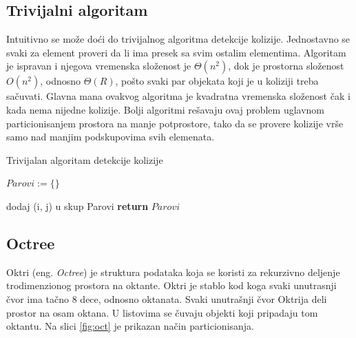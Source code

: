 \documentclass{article}
\begin{document}
{\subsection{Trivijalni algoritam}
\label{subsec:triv}

Intuitivno se može doći do trivijalnog algoritma detekcije kolizije. 
Jednostavno se svaki za element proveri da li ima presek sa svim ostalim elementima.
Algoritam je ispravan i njegova vremenska složenost je $\Theta (n^2) $, dok je prostorna složenost
$O(n^2)$, odnosno $\Theta(R)$, pošto svaki par objekata koji je u koliziji treba sačuvati.
Glavna mana ovakvog algoritma je kvadratna vremenska složenost čak i kada nema nijedne kolizije.
Bolji algoritmi rešavaju ovaj problem uglavnom particionisanjem prostora na manje potprostore, tako da
se provere kolizije vrše samo nad manjim podskupovima svih elemenata.

\begin{algorithm}
	\caption{Trivijalan algoritam detekcije kolizije}
    \label{alg:triv}
	\begin{algorithmic}[1]
		\State $Parovi := \{ \}$

				\State dodaj (i, j) u skup Parovi
			\EndIf		
		\EndFor
		\EndFor
		\State \textbf{return} $Parovi$
		\EndProcedure
    \end{algorithmic}
\end{algorithm}

\subsection{Octree}
\label{subsec:octree}

Oktri (eng. {\em Octree}) je struktura podataka koja se koristi za rekurzivno deljenje trodimenzionog
prostora na oktante. Oktri je stablo kod koga svaki unutrasnji čvor ima tačno 8 dece, odnosno oktanata. 
Svaki unutrašnji čvor Oktrija deli prostor na osam oktana.
U listovima se čuvaju objekti koji pripadaju tom oktantu.
Na slici \ref{fig:oct} je prikazan način particionisanja.

}
\end{document}
